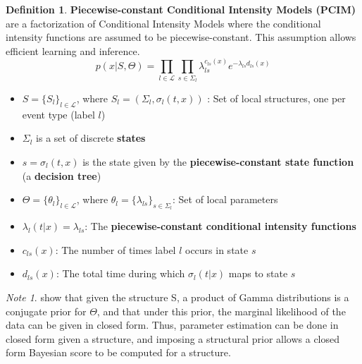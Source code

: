 \documentclass[12pt]{article}
\theoremstyle{plain}
\theoremstyle{definition}
\newtheorem{definition}{Definition}
\theoremstyle{remark}
\newtheorem*{note}{Note}
\begin{document}

\begin{definition}
  \textbf{Piecewise-constant Conditional Intensity Models (PCIM)} are
  a factorization of Conditional Intensity Models where the conditional
  intensity functions are assumed to be piecewise-constant. This assumption
  allows efficient learning and inference.
  \begin{equation*}
    p(x|S,\Theta) = \prod_{l\in\mathcal{L}}\prod_{s\in\Sigma_l}\lambda_{ls}^{c_{ls}(x)}
    e^{-\lambda_{ls}d_{ls}(x)}
  \end{equation*}
  \begin{itemize}
    \item $S=\{S_l\}_{l\in\mathcal{L}}$, where $S_l=\left(\Sigma_l,\sigma_l(t,x)\right)$
      : Set of local structures, one per event type (label $l$)
    \item $\Sigma_l$ is a set of discrete \textbf{states}
    \item $s=\sigma_l(t,x)$ is the state given by the
      \textbf{piecewise-constant state function} (a \textbf{decision tree})
    \item $\Theta=\{\theta_l\}_{l\in\mathcal{L}}$,
      where $\theta_l=\{\lambda_{ls}\}_{s\in\Sigma_l}$: Set of local parameters
    \item $\lambda_l(t|x)=\lambda_{ls}$:
      The \textbf{piecewise-constant conditional intensity functions}
    \item $c_{ls}(x)$: The number of times label $l$ occurs in state $s$
    \item $d_{ls}(x)$: The total time during which $\sigma_l(t|x)$ maps to state $s$
  \end{itemize}
\end{definition}

\begin{note}
  \cite{gunmeexu11} show that given the structure S, a product of Gamma
  distributions is a conjugate prior for $\Theta$, and that under this prior,
  the marginal likelihood of the data can be given in closed form.
  Thus, parameter estimation can be done in closed form given a structure, and
  imposing a structural prior allows a closed form Bayesian score to be computed
  for a structure.
\end{note}
\end{document}
